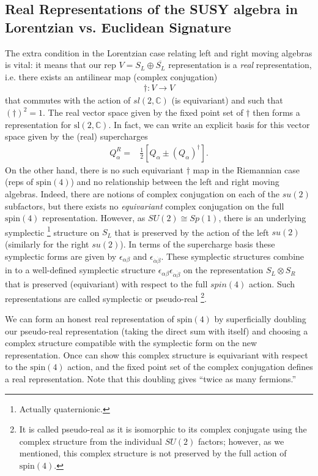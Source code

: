 \documentclass[12pt, onecolumn]{article}
\begin{document}
\subsection{Real Representations of the SUSY algebra in Lorentzian vs. Euclidean Signature}
\label{sec_LorentzvsEuc}
The extra condition in the Lorentzian case relating left and right moving algebras is vital: it means that our rep $V=S_{L} \oplus \overline{S_{L}}$ representation is a \textit{real} representation, i.e. there exists an antilinear map (complex conjugation)
\begin{align*}
\dagger: V \rightarrow V
\end{align*}
that commutes with the action of $sl(2,\mathbb{C})$ (is equivariant) and such that $(\dagger)^2=1$.  The real vector space given by the fixed point set of $\dagger$ then forms a representation for $\text{sl}(2,\mathbb{C})$.  In fact, we can write an explicit basis for this vector space given by the (real) supercharges
\begin{align*}
Q^{R}_{\alpha}=&\frac{1}{2}\left[Q_{\alpha}\pm (Q_{\alpha})^{\dagger}\right].
\end{align*}
On the other hand, there is no such equivariant $\dagger$ map in the Riemannian case (reps of $\text{spin}(4)$) and no relationship between the left and right moving algebras.  Indeed, there are notions of complex conjugation on each of the $su(2)$ subfactors, but there exists no \textit{equivariant} complex conjugation on the full $\text{spin}(4)$ representation.  However, as $SU(2) \cong Sp(1)$, there is an underlying symplectic \footnote{Actually quaternionic.} structure on $S_{L}$ that is preserved by the action of the left $su(2)$ (similarly for the right $su(2)$).  In terms of the supercharge basis these symplectic forms are given by $\epsilon_{\alpha \beta}$ and $\epsilon_{\dot{\alpha}\dot{\beta}}$.  These symplectic structures combine in to a well-defined symplectic structure $\epsilon_{\alpha \beta}\epsilon_{\dot{\alpha}\dot{\beta}}$ on the representation $S_{L} \otimes S_{R}$ that is preserved (equivariant) with respect to the full $spin(4)$ action.  Such representations are called symplectic or pseudo-real \footnote{It is called pseudo-real as it is isomorphic to its complex conjugate using the complex structure from the individual $SU(2)$ factors; however, as we mentioned, this complex structure is not preserved by the full action of $\text{spin}(4)$.}.  

\vspace{5mm}

\noindent We can form an honest real representation of $\text{spin}(4)$ by superficially doubling our pseudo-real representation (taking the direct sum with itself) and choosing a complex structure compatible with the symplectic form on the new representation.  Once can show this complex structure is equivariant with respect to the $\text{spin}(4)$ action, and the fixed point set of the complex conjugation defines a real representation.  Note that this doubling gives ``twice as many fermions.''
\end{document}

